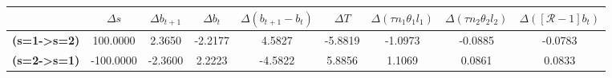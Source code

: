 \begin{tiny}\begin{tabular}{|l|c|c|c|c|c|c|c|c|}
\hline
&\textbf{$\Delta s$}&\textbf{$\Delta b_{t+1}$}&\textbf{$\Delta b_{t}$}&\textbf{$\Delta (b_{t+1}-b_{t})$}&\textbf{$\Delta T$}&\textbf{$\Delta (\tau n_1\theta_1 l_1 )$}&\textbf{$\Delta (\tau n_2\theta_2 l_2)$}&\textbf{$\Delta ([\mathcal{R}-1]b_t)$}\\\hline
\textbf{(s=1->s=2)}&100.0000&2.3650&-2.2177&4.5827&-5.8819&-1.0973&-0.0885&-0.0783\\\hline
\textbf{ (s=2->s=1)}&-100.0000&-2.3600&2.2223&-4.5822&5.8856&1.1069&0.0861&0.0833\\\hline
\end{tabular}
\end{tiny}